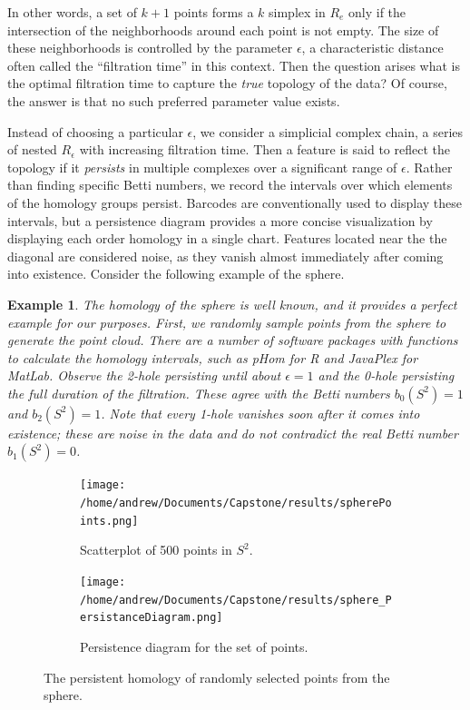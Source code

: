 \documentclass[11pt]{amsart}
\newtheorem{examp}[equation]{Example}
\theoremstyle{remark}	  \newtheorem*{remark}{Remark}
\numberwithin{equation}{section}
\begin{document}
In other words, a set of $k+1$ points forms a $k$ simplex in $R_e$ only if the intersection of the  neighborhoods around each point is not empty. The size of these neighborhoods is controlled by the parameter $\epsilon$, a characteristic distance often called the ``filtration time'' in this context. Then the question arises what is the optimal filtration time to capture the \emph{true} topology of the data? Of course, the answer is that no such preferred parameter value exists. 


Instead of choosing a particular $\epsilon$, we consider a simplicial complex chain, a series of nested $R_\epsilon$ with increasing filtration time. Then a feature is said to reflect the topology if it \emph{persists} in multiple complexes over a significant range of $\epsilon$. Rather than finding specific Betti numbers, we record the intervals over which elements of the homology groups persist. Barcodes are conventionally used to display these intervals, but a persistence diagram provides a more concise visualization by displaying each order homology in a single chart. Features located near the the diagonal are considered noise, as they vanish almost immediately after coming into existence. Consider the following example of the sphere. 

\begin{examp}
The homology of the sphere is well known, and it provides a  perfect example for our purposes. First, we randomly sample points from the sphere to generate the point cloud. There are a number of software packages with functions to calculate the homology intervals, such as \emph{pHom} for R and \emph{JavaPlex} for MatLab. Observe the 2-hole persisting until about $\epsilon = 1$ and the 0-hole persisting the full duration of the filtration. These agree with the Betti numbers $b_0(S^2) = 1$ and $b_2(S^2) = 1$. Note that every 1-hole vanishes soon after it comes into existence; these are noise in the data and do not contradict the real Betti number $b_1(S^2) = 0$.  
\end{examp}

\begin{figure}
\centering
\begin{subfigure}{.5\textwidth}
  \centering
  \texttt{[image: /home/andrew/Documents/Capstone/results/spherePoints.png]}
  \caption{Scatterplot of 500 points in $S^2$.}
  \label{fig:sub1}
\end{subfigure}%
\begin{subfigure}{.5\textwidth}
  \centering
  \texttt{[image: /home/andrew/Documents/Capstone/results/sphere\_PersistanceDiagram.png]}
  \caption{Persistence diagram for the set of points.}
  \label{fig:sub2}
\end{subfigure}
\caption{The persistent homology of randomly selected points from the sphere.}
\label{fig:test}
\end{figure}
\end{document}
